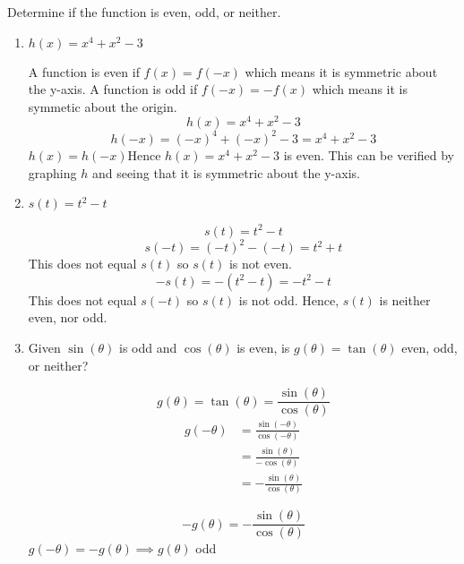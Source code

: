 \documentclass[nooutcomes, noinstructornotes]{ximera}
\begin{document}
\begin{problem}
Determine if the function is even, odd, or neither.


\begin{enumerate}	
	\item  $h(x)=x^4+x^2-3$
		\begin{freeResponse}

		A function is even if $f(x)=f(-x)$ which means it is symmetric about the y-axis.  A function is odd if $f(-x)=-f(x)$ which means it is symmetic about the origin. 
		 $$h(x)=x^4+x^2-3$$
			$$h(-x)=(-x)^4+(-x)^2-3=x^4+x^2-3$$
			$h(x)=h(-x)$Hence $h(x)=x^4+x^2-3$ is even.  This can be verified by graphing $h$ and seeing that it is symmetric about the y-axis.
		\end{freeResponse}

	\item  $s(t)=t^2-t$
		\begin{freeResponse}
			$$s(t)=t^2-t$$
			$$s(-t)=(-t)^2-(-t)=t^2+t$$ This does not equal $s(t)$ so $s(t)$ is not even.
			$$-s(t)=-(t^2-t)=-t^2-t$$  This does not equal $s(-t)$ so $s(t)$ is not odd.  Hence, $s(t)$ is neither even, nor odd.
		\end{freeResponse}

	\item  Given $\sin(\theta)$ is odd and $\cos(\theta)$ is even, is $g(\theta)=\tan(\theta)$ even, odd, or neither?
		\begin{freeResponse}
		 $$g(\theta)=\tan(\theta)=\frac{\sin(\theta)}{\cos(\theta)}$$
			\begin{align*}
			g(-\theta)&=\frac{\sin(-\theta)}{\cos(-\theta)}\\
			&=\frac{\sin(\theta)}{-\cos(\theta)}\\
			&=-\frac{\sin(\theta)}{\cos(\theta)}
			\end{align*}
			\begin{center}
			$$-g(\theta)=-\frac{\sin(\theta)}{\cos(\theta)}$$
			$g(-\theta)=-g(\theta) \implies g(\theta)$ odd
			\end{center}
		\end{freeResponse}
	\end{enumerate}
	

	
\end{problem}

\begin{instructorNotes}

\end{instructorNotes}
\end{document}
